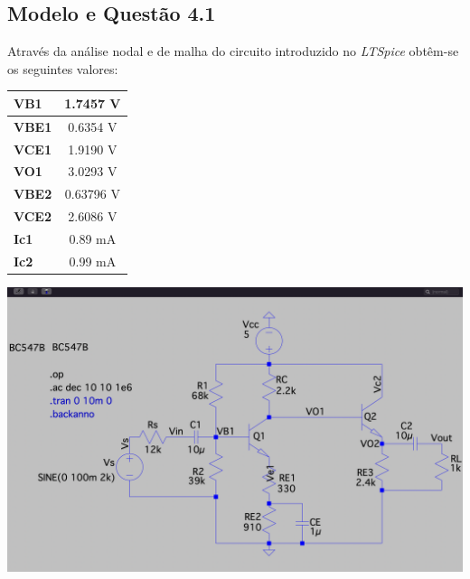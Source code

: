 \documentclass[a4paper,12pt]{article}
\begin{document}
			\subsection{Modelo e Questão 4.1}
				Através da análise nodal e de malha do circuito introduzido no \textit{LTSpice} obtêm-se os seguintes valores:\\
				\begin{minipage}[H]{0.45\textwidth}
				\begin{table}[H]
					\centering
					\begin{tabular}{|l|c|}
						\hline
						\textbf{VB1}  &  1.7457 V\\ \hline
						\textbf{VBE1} &  0.6354 V\\ \hline
						\textbf{VCE1} &  1.9190 V\\ \hline
						\textbf{VO1}  &  3.0293 V\\ \hline
						\textbf{VBE2} &  0.63796 V\\ \hline
						\textbf{VCE2} &  2.6086 V\\ \hline
						\textbf{Ic1}  &  0.89 mA\\ \hline
						\textbf{Ic2}  &  0.99 mA\\ \hline
					\end{tabular}
				\end{table}

				\end{minipage}
				\hfill
				\begin{minipage}[H]{0.45\textwidth}
                                          \centering
                                          \captionsetup{justification=centering}
                                          \includegraphics[scale=0.15\textscale]{spice.png}
                                  
				\end{minipage}
\end{document}
